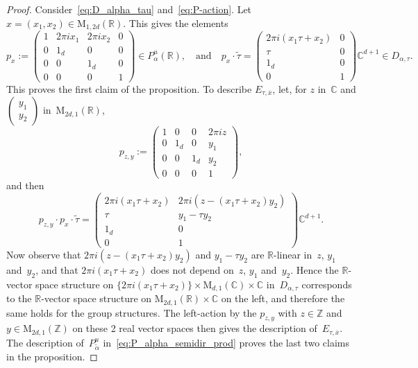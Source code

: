 \documentclass[JEP,XML,SOM,Unicode,NoFloatCountersInSection]{cedram}
\theoremstyle{plain}
\theoremstyle{definition}
\numberwithin{equation}{subsection}
\let\ol\overline
\renewcommand{\C}{\mathbb C}
\newcommand{\R}{\mathbb R}
\newcommand{\Z}{\mathbb Z}
\newcommand{\rmM}{\mathrm{M}}
\begin{document}
\begin{proof}
Consider~\eqref{eq:D_alpha_tau} and~\eqref{eq:P-action}.
Let $x=(x_1,x_2)\in\rmM_{1,2d}(\R)$. This gives the elements
\[
p_x :=
\begin{pmatrix}
1 & 2\pi ix_1 & 2\pi ix_2 & 0\\
0 & 1_d & 0 & 0\\
0 & 0 & 1_d & 0\\
0 & 0 & 0 & 1
\end{pmatrix}
\in P^u_\alpha(\R),
\quad
\text{and}
\quad
p_x{\cdot}\tilde{\tau} =
\begin{pmatrix}
2\pi i(x_1\tau + x_2)& 0\\
\tau & 0\\ 1_d & 0\\ 0 & 1
\end{pmatrix}
\C^{d+1}\in D_{\alpha,\tau}.
\]
This proves the first claim of the proposition. To describe
$E_{\tau,\ol{x}}$, let, for $z$ in~$\C$ and
$(\begin{smallmatrix}y_1\\y_2\end{smallmatrix})$ in~$\rmM_{2d,1}(\R)$,
\[
p_{z,y} :=
\begin{pmatrix}
1 & 0 & 0 & 2\pi i z\\
0 & 1_d & 0 & y_1\\
0 & 0 & 1_d & y_2\\
0 & 0 & 0 & 1
\end{pmatrix},
\]
and then
\[
p_{z,y}{\cdot}p_x{\cdot}\tilde{\tau} =
\begin{pmatrix}
2\pi i(x_1\tau + x_2)& 2\pi i(z-(x_1\tau+x_2)y_2)\\
\tau & y_1-\tau y_2\\ 1_d & 0\\ 0 & 1
\end{pmatrix}
\C^{d+1}.
\]
Now observe that $2\pi i(z-(x_1\tau+x_2)y_2)$ and $y_1-\tau y_2$ are
$\R$-linear in~$z$, $y_1$ and~$y_2$, and that $2\pi i(x_1\tau + x_2)$
does not depend on~$z$, $y_1$ and~$y_2$. Hence the $\R$-vector space
structure on $\{2\pi i(x_1\tau + x_2)\}\times\rmM_{d,1}(\C)\times \C$
in~$D_{\alpha,\tau}$ corresponds to the $\R$-vector space structure on
$\rmM_{2d,1}(\R)\times\C$ on the left, and therefore the same holds
for the group structures. The left-action by the $p_{z,y}$ with
$z\in\Z$ and $y\in\rmM_{2d,1}(\Z)$ on these 2 real vector spaces then
gives the description of~$E_{\tau,\ol{x}}$. The description
of~$P^u_{\tilde{\alpha}}$ in~\eqref{eq:P_alpha_semidir_prod} proves
the last two claims in the proposition.
\end{proof}
\end{document}
